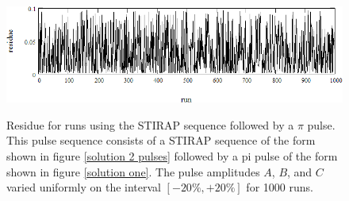\begin{figure}
\includegraphics[width=6.00in]
{STIRAP_pi/STIRAP_pi.png}\\
\caption[Residue for runs using the STIRAP sequence followed by a $\pi$ pulse]{Residue for runs using the STIRAP sequence followed by a $\pi$ pulse. This pulse sequence consists of a STIRAP sequence of the form shown in figure \ref{solution 2 pulses}  followed by a pi pulse of the form shown in figure \ref{solution one}. The pulse amplitudes $A$, $B$, and $C$ varied uniformly on the interval $[-20\%,+20\%]$ for 1000 runs.}
\label{STIRAP plus pi pulse}
\end{figure} 
